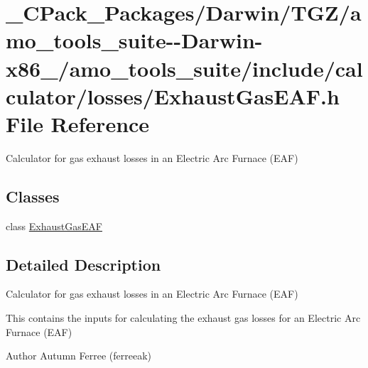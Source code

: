 \hypertarget{___c_pack___packages_2_darwin_2_t_g_z_2amo__tools__suite--_darwin-x86__64_2amo__tools__suite_2inb14cb7d180b1e54924c4aa7f14007398}{}\section{\+\_\+\+C\+Pack\+\_\+\+Packages/\+Darwin/\+T\+G\+Z/amo\+\_\+tools\+\_\+suite-\/-\/\+Darwin-\/x86\+\_/amo\+\_\+tools\+\_\+suite/include/calculator/losses/\+Exhaust\+Gas\+E\+AF.h File Reference}
\label{___c_pack___packages_2_darwin_2_t_g_z_2amo__tools__suite--_darwin-x86__64_2amo__tools__suite_2inb14cb7d180b1e54924c4aa7f14007398}


Calculator for gas exhaust losses in an Electric Arc Furnace (E\+AF)  


\subsection*{Classes}
\begin{DoxyCompactItemize}
\item 
class \hyperlink{class_exhaust_gas_e_a_f}{Exhaust\+Gas\+E\+AF}
\end{DoxyCompactItemize}


\subsection{Detailed Description}
Calculator for gas exhaust losses in an Electric Arc Furnace (E\+AF) 

This contains the inputs for calculating the exhaust gas losses for an Electric Arc Furnace (E\+AF)

\begin{DoxyAuthor}{Author}
Autumn Ferree (ferreeak) 
\end{DoxyAuthor}
